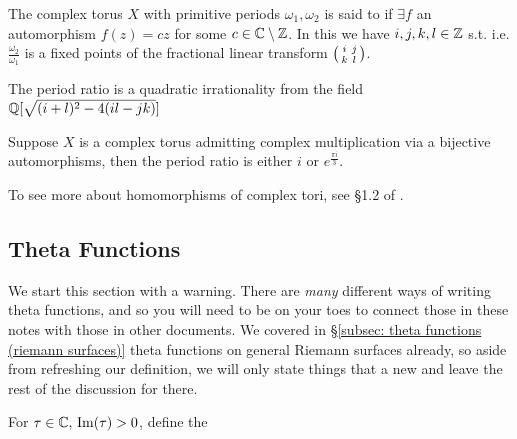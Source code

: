 \documentclass{article}
\begin{document}
\begin{definition}
	The complex torus $X$ with primitive periods $\omega_1, \omega_2$ is said to  if $\exists f$ an automorphism $f(z) = cz$ for some $c \in \mathbb{C}\setminus\mathbb{Z}$. In this we have $i,j,k,l \in \mathbb{Z}$ s.t.
	i.e. $\frac{\omega_2}{\omega_1}$ is a fixed points of the fractional linear transform $\begin{psmallmatrix} i & j \\ k & l \end{psmallmatrix}$. 
\end{definition}

\begin{lemma}
	The period ratio is a quadratic irrationality from the field $\mathbb{Q}[\sqrt{(i+l)^2 - 4(il-jk)}]$
\end{lemma}

\begin{prop}
	Suppose $X$ is a complex torus admitting complex multiplication via a bijective automorphisms, then the period ratio is either $i$ or $e^{\frac{\pi i}{3}}$. 
\end{prop}

\begin{remark}
	To see more about homomorphisms of complex tori, see \S1.2 of \cite{Birkenhake2004}.
\end{remark}


\subsection{Theta Functions}\label{subsec: theta functions (elliptic curves)}
We start this section with a warning. There are \emph{many} different ways of writing theta functions, and so you will need to be on your toes to connect those in these notes with those in other documents. We covered in \S \ref{subsec: theta functions (riemann surfaces)} theta functions on general Riemann surfaces already, so aside from refreshing our definition, we will only state things that a new and leave the rest of the discussion for there. 
\begin{definition}
	For $\tau \in \mathbb{C}, \, \operatorname{Im}(\tau)>0$, define the  
\end{definition}
\end{document}
